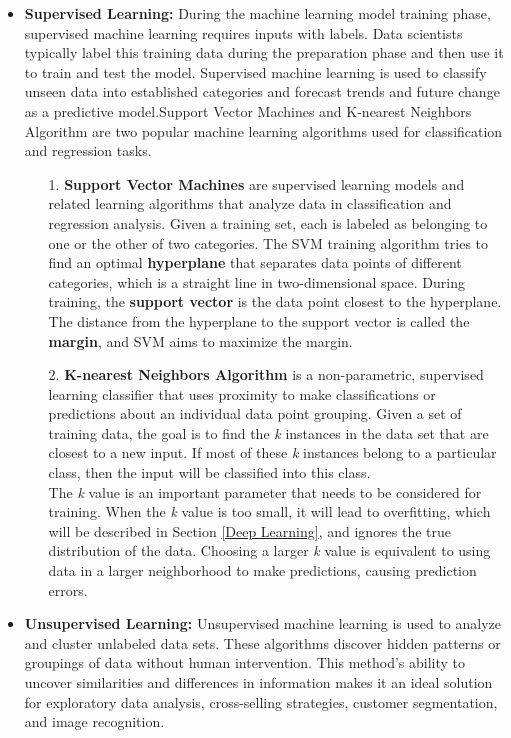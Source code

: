 \documentclass[english,version-2022-01]{uzl-thesis}
\begin{document}
\begin{itemize}
    \item \textbf{Supervised Learning:} During the machine learning model training phase, supervised machine learning requires inputs with labels. Data scientists typically label this training data during the preparation phase and then use it to train and test the model. Supervised machine learning is used to classify unseen data into established categories and forecast trends and future change as a predictive model.\cite{Lehr_2021}Support Vector Machines and K-nearest Neighbors Algorithm are two popular machine learning algorithms used for classification and regression tasks.
    \begin{enumerate}
    \item[1.] \textbf{Support Vector Machines} are supervised learning models and related learning algorithms that analyze data in classification and regression analysis.\cite{cortes1995support} Given a training set, each is labeled as belonging to one or the other of two categories. The SVM training algorithm tries to find an optimal \textbf{hyperplane} that separates data points of different categories, which is a straight line in two-dimensional space. During training, the \textbf{support vector} is the data point closest to the hyperplane. The distance from the hyperplane to the support vector is called the \textbf{margin}, and SVM aims to maximize the margin.
    \item[2.] \textbf{K-nearest Neighbors Algorithm} is a non-parametric, supervised learning classifier that uses proximity to make classifications or predictions about an individual data point grouping.\cite{larose2014k} Given a set of training data, the goal is to find the \textit{k} instances in the data set that are closest to a new input. If most of these \textit{k} instances belong to a particular class, then the input will be classified into this class.\\
    The \textit{k} value is an important parameter that needs to be considered for training. When the \textit{k} value is too small, it will lead to overfitting, which will be described in Section \ref{Deep Learning}, and ignores the true distribution of the data. Choosing a larger \textit{k} value is equivalent to using data in a larger neighborhood to make predictions, causing prediction errors.
    \end{enumerate}
    \item \textbf{Unsupervised Learning:} Unsupervised machine learning is used to analyze and cluster unlabeled data sets. These algorithms discover hidden patterns or groupings of data without human intervention. This method's ability to uncover similarities and differences in information makes it an ideal solution for exploratory data analysis, cross-selling strategies, customer segmentation, and image recognition.\cite{Lehr_2021}\\

\end{itemize}
\end{document}
